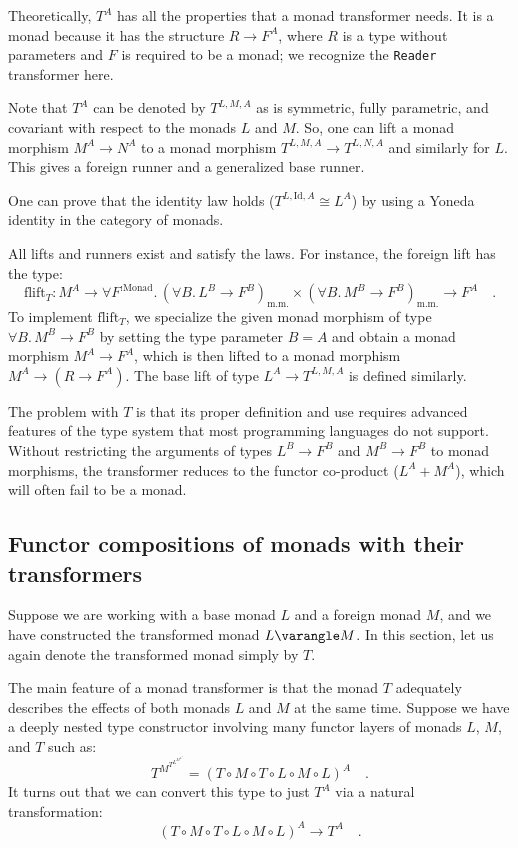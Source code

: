 Theoretically, $T^{A}$ has all the properties that a monad transformer
needs. It is a monad because it has the structure $R\rightarrow F^{A}$,
where $R$ is a type without parameters and $F$ is required to be
a monad; we recognize the \lstinline!Reader! transformer here.

Note that $T^{A}$ can be denoted by $T^{L,M,A}$ as is symmetric,
fully parametric, and covariant with respect to the monads $L$ and
$M$. So, one can lift a monad morphism $M^{A}\rightarrow N^{A}$
to a monad morphism $T^{L,M,A}\rightarrow T^{L,N,A}$ and similarly
for $L$. This gives a foreign runner and a generalized base runner.

One can prove that the identity law holds ($T^{L,\text{Id},A}\cong L^{A}$)
by using a Yoneda identity in the category of monads. 

All lifts and runners exist and satisfy the laws. For instance, the
foreign lift has the type:
\[
\text{flift}_{T}:M^{A}\rightarrow\forall F^{:\text{Monad}}.\,(\forall B.\,L^{B}\rightarrow F^{B})_{\text{m.m.}}\times(\forall B.\,M^{B}\rightarrow F^{B})_{\text{m.m.}}\rightarrow F^{A}\quad.
\]
To implement $\text{flift}_{T}$, we specialize the given monad morphism
of type $\forall B.\,M^{B}\rightarrow F^{B}$ by setting the type
parameter $B=A$ and obtain a monad morphism $M^{A}\rightarrow F^{A}$,
which is then lifted to a monad morphism $M^{A}\rightarrow(R\rightarrow F^{A})$.
The base lift of type $L^{A}\rightarrow T^{L,M,A}$ is defined similarly.

The problem with $T$ is that its proper definition and use requires
advanced features of the type system that most programming languages
do not support. Without restricting the arguments of types $L^{B}\rightarrow F^{B}$
and $M^{B}\rightarrow F^{B}$ to monad morphisms, the transformer
reduces to the functor co-product ($L^{A}+M^{A}$), which will often
fail to be a monad.

\subsection{Functor compositions of monads with their transformers}

Suppose we are working with a base monad $L$ and a foreign monad
$M$, and we have constructed the transformed monad $L\varangle M$.
In this section, let us again denote the transformed monad simply
by $T$. 

The main feature of a monad transformer is that the monad $T$ adequately
describes the effects of both monads $L$ and $M$ at the same time.
Suppose we have a deeply nested type constructor involving many functor
layers of monads $L$, $M$, and $T$ such as:
\[
T^{M^{T^{L^{M^{L^{A}}}}}}=\left(T\circ M\circ T\circ L\circ M\circ L\right)^{A}\quad.
\]
It turns out that we can convert this type to just $T^{A}$ via a
natural transformation:
\[
\left(T\circ M\circ T\circ L\circ M\circ L\right)^{A}\rightarrow T^{A}\quad.
\]

